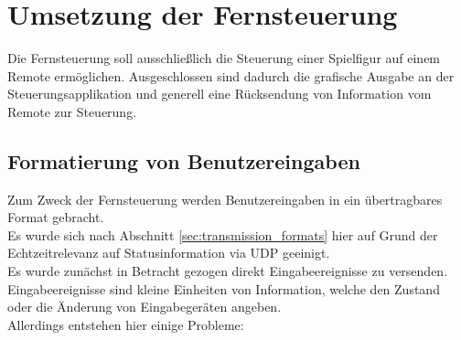\section{Umsetzung der Fernsteuerung}

Die Fernsteuerung soll ausschließlich die Steuerung einer Spielfigur auf einem Remote ermöglichen. Ausgeschlossen sind dadurch die grafische Ausgabe an der Steuerungsapplikation und generell eine Rücksendung von Information vom Remote zur Steuerung.\\

\subsection{Formatierung von Benutzereingaben}
Zum Zweck der Fernsteuerung werden Benutzereingaben in ein übertragbares Format gebracht.\\
Es wurde sich nach Abschnitt \ref{sec:transmission_formats} hier auf Grund der Echtzeitrelevanz auf Statusinformation via UDP geeinigt.\\
Es wurde zunächst in Betracht gezogen direkt Eingabeereignisse zu versenden. Eingabeereignisse sind
kleine Einheiten von Information, welche den Zustand oder die Änderung von Eingabegeräten angeben.\\
Allerdings entstehen hier einige Probleme:
